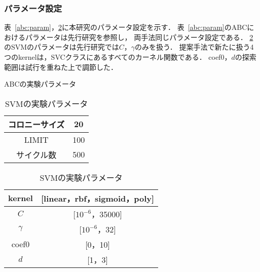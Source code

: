 \subsubsection{パラメータ設定}
表~\ref{abc:param}，\ref{svm:param}に本研究のパラメータ設定を示す．
表~\ref{abc:param}のABCにおけるパラメータは先行研究を参照し，
両手法同じパラメータ設定である\cite{origin}．
\ref{svm:param}のSVMのパラメータは先行研究では$C$，$\gamma$のみを扱う．
提案手法で新たに扱う4つのkernelは，SVCクラスにあるすべてのカーネル関数である．
coef0，$d$の探索範囲は試行を重ねた上で調節した．


\begin{table}[tb]
    \centering
    \begin{minipage}{0.45\textwidth}  %
      \centering
      \caption{ABCの実験パラメータ}  %
      \begin{tabular}{|c|c|}  %
        \hline  %
        コロニーサイズ & 20 \\  %
        \hline  %
        LIMIT & 100 \\  %
        \hline  %
        サイクル数 & 500 \\  %
        \hline  %
      \end{tabular}
      \label{abc:param}  %
    \end{minipage}
    \begin{minipage}{0.45\textwidth}  %
      \centering
      \caption{SVMの実験パラメータ}  %
      \begin{tabular}{|c|c|}  %
        \hline  %
        kernel & [linear，rbf，sigmoid，poly] \\  %
        \hline  %
        $C$ & [$10^{-6}$，35000] \\  %
        \hline  %
        $\gamma$ & [$10^{-6}$，32] \\  %
        \hline  %
        coef0 & [0，10] \\  %
        \hline  %
        $d$ & [1，3] \\  %
        \hline  %
      \end{tabular}
      \label{svm:param}  %
    \end{minipage}
  \end{table}
